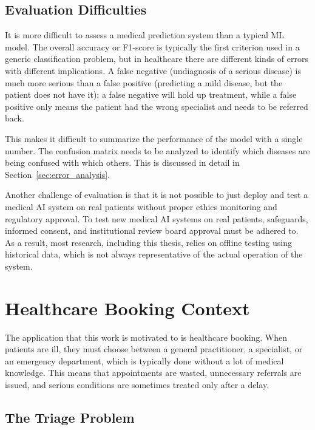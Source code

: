 \subsection{Evaluation Difficulties}

It is more difficult to assess a medical prediction system than a typical ML model. The overall accuracy or F1-score is typically the first criterion used in a generic classification problem, but in healthcare there are different kinds of errors with different implications. A false negative (undiagnosis of a serious disease) is much more serious than a false positive (predicting a mild disease, but the patient does not have it): a false negative will hold up treatment, while a false positive only means the patient had the wrong specialist and needs to be referred back.

This makes it difficult to summarize the performance of the model with a single number. The confusion matrix needs to be analyzed to identify which diseases are being confused with which others. This is discussed in detail in Section~\ref{sec:error_analysis}.

Another challenge of evaluation is that it is not possible to just deploy and test a medical AI system on real patients without proper ethics monitoring and regulatory approval. To test new medical AI systems on real patients, safeguards, informed consent, and institutional review board approval must be adhered to. As a result, most research, including this thesis, relies on offline testing using historical data, which is not always representative of the actual operation of the system.

\section{Healthcare Booking Context}
\label{sec:booking_context}

The application that this work is motivated to is healthcare booking. When patients are ill, they must choose between a general practitioner, a specialist, or an emergency department, which is typically done without a lot of medical knowledge. This means that appointments are wasted, unnecessary referrals are issued, and serious conditions are sometimes treated only after a delay.

\subsection{The Triage Problem}


